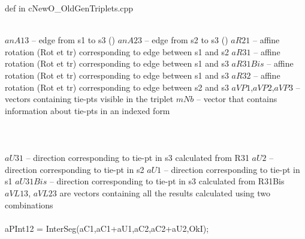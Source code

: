  
\begin{algorithm} 
\caption{ def in cNewO\_OldGenTriplets.cpp  }
\begin{algorithmic}%
\State  
\\
\Comment {}
\State $anA13$ -- edge from s1 to s3 ()
\State $anA23$ -- edge from s2 to s3 ()
\State $aR21$ --  affine rotation (Rot et tr) corresponding to edge between s1 and s2
\State $aR31$ --  affine rotation (Rot et tr) corresponding to edge between s1 and s3
\State $aR31Bis$ -- affine rotation (Rot et tr) corresponding to edge between s1 and s3 
\State $aR32$ --  affine rotation (Rot et tr) corresponding to edge between s2 and s3
\State $aVP1$,$aVP2$,$aVP3$ -- vectors containing tie-pts visible in the triplet
\State $mNb$ -- vector that contains information about tie-pts in an indexed form
\\
\\
\Comment {}
%
\\
\\
\Comment {}
\State $aU31$ -- direction corresponding to tie-pt in s3 calculated from R31
\State $aU2$ -- direction corresponding to tie-pt in s2
\State $aU1$ -- direction corresponding to tie-pt in s1
\State $aU31Bis$ -- direction corresponding to tie-pt in s3 calculated from R31Bis
\\
\State $aVL13$, $aVL23$ are vectors containing all the results calculated using two combinations
\\
\\
\Comment {}
\State aPInt12 = InterSeg(aC1,aC1+aU1,aC2,aC2+aU2,OkI);

\end{algorithmic}
\end{algorithm}
